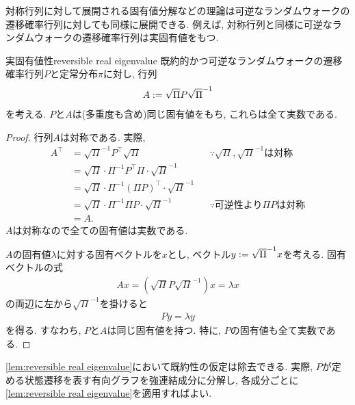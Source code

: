 対称行列に対して展開される固有値分解などの理論は可逆なランダムウォークの遷移確率行列に対しても同様に展開できる.
例えば, 対称行列と同様に可逆なランダムウォークの遷移確率行列は実固有値をもつ.
\begin{lemma}{実固有値性}{reversible real eigenvalue}
    既約的かつ可逆なランダムウォークの遷移確率行列$P$と定常分布$\pi$に対し,
    行列
    \begin{align}
        A \mathrel{:=} \sqrt{\Pi} P \sqrt{\Pi}^{-1} \label{eq: symmetrized P}
    \end{align}
    を考える.
    $P$と$A$は(多重度も含め)同じ固有値をもち, これらは全て実数である.
\end{lemma}
\begin{proof}
    行列$A$は対称である.
    実際,
    \begin{align*}
        A^\top & = \sqrt{\Pi}^{-1} P^{\top} \sqrt{\Pi}                            &  & \text{$\because$$\sqrt{\Pi},\sqrt{\Pi}^{-1}$は対称} \\
               & = \sqrt{\Pi} \cdot \Pi^{-1} P^{\top} \Pi \cdot \sqrt{\Pi}^{-1}                                                         \\
               & = \sqrt{\Pi} \cdot \Pi^{-1} (\Pi P)^{\top} \cdot \sqrt{\Pi}^{-1}                                                       \\
               & = \sqrt{\Pi} \cdot \Pi^{-1} \Pi P \cdot \sqrt{\Pi}^{-1}          &  & \text{$\because$可逆性より$\Pi P$は対称}                 \\
               & = A.
    \end{align*}
    $A$は対称なので全ての固有値は実数である.

    $A$の固有値$\lambda$に対する固有ベクトルを$x$とし, ベクトル$y\mathrel{:=} \sqrt{\Pi}^{-1}x$を考える.
    固有ベクトルの式
    \begin{align*}
        A x = (\sqrt{\Pi} P \sqrt{\Pi}^{-1})x =  \lambda x
    \end{align*}
    の両辺に左から$\sqrt{\Pi}^{-1}$を掛けると
    \begin{align*}
        P y = \lambda y
    \end{align*}
    を得る.
    すなわち, $P$と$A$は同じ固有値を持つ.
    特に, $P$の固有値も全て実数である.
\end{proof}
\cref{lem:reversible real eigenvalue}において既約性の仮定は除去できる.
実際, $P$が定める状態遷移を表す有向グラフを強連結成分に分解し,
各成分ごとに\cref{lem:reversible real eigenvalue}を適用すればよい.


